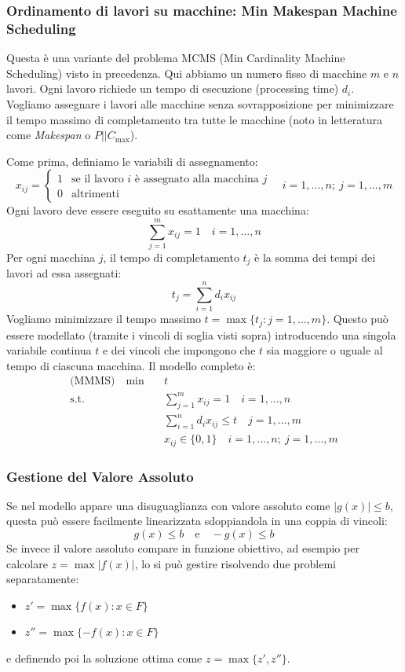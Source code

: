 \documentclass[12pt]{extarticle} %
\begin{document}
\subsubsection{Ordinamento di lavori su macchine: Min Makespan Machine Scheduling}
Questa è una variante del problema MCMS (Min Cardinality Machine Scheduling) visto in precedenza. Qui abbiamo un numero fisso di macchine $m$ e $n$ lavori. Ogni lavoro richiede un tempo di esecuzione (processing time) $d_i$. Vogliamo assegnare i lavori alle macchine senza sovrapposizione per minimizzare il tempo massimo di completamento tra tutte le macchine (noto in letteratura come \textit{Makespan} o $P||C_{\max}$).

Come prima, definiamo le variabili di assegnamento:
\[
x_{ij} = \begin{cases}
1 & \text{se il lavoro } i \text{ è assegnato alla macchina } j \\
0 & \text{altrimenti}
\end{cases} \quad i=1,\dots,n; \: j=1,\dots,m
\]
Ogni lavoro deve essere eseguito su esattamente una macchina:
\[
\sum_{j=1}^m x_{ij} = 1 \quad i=1,\dots,n
\]
Per ogni macchina $j$, il tempo di completamento $t_j$ è la somma dei tempi dei lavori ad essa assegnati:
\[
t_j = \sum_{i=1}^n d_i x_{ij}
\]
Vogliamo minimizzare il tempo massimo $t = \max \{t_j : j=1,\dots,m\}$. Questo può essere modellato (tramite i vincoli di soglia visti sopra) introducendo una singola variabile continua $t$ e dei vincoli che impongono che $t$ sia maggiore o uguale al tempo di ciascuna macchina.
Il modello completo è:
\[
\begin{aligned}
\text{(MMMS)} \quad \min \quad & t \\
\text{s.t.} \quad & \sum_{j=1}^m x_{ij} = 1 \quad i=1,\dots,n \\
& \sum_{i=1}^n d_i x_{ij} \le t \quad j=1,\dots,m \\
& x_{ij} \in \{0,1\} \quad i=1,\dots,n; \: j=1,\dots,m
\end{aligned}
\]

\subsubsection{Gestione del Valore Assoluto}
Se nel modello appare una disuguaglianza con valore assoluto come $|g(x)| \le b$, questa può essere facilmente linearizzata sdoppiandola in una coppia di vincoli:
\[
g(x) \le b \quad \text{e} \quad -g(x) \le b
\]
Se invece il valore assoluto compare in funzione obiettivo, ad esempio per calcolare $z = \max |f(x)|$, lo si può gestire risolvendo due problemi separatamente:
\begin{itemize}
    \item $z' = \max \{f(x) : x \in F\}$
    \item $z'' = \max \{-f(x) : x \in F\}$
\end{itemize}
e definendo poi la soluzione ottima come $z = \max\{z', z''\}$.
\end{document}
